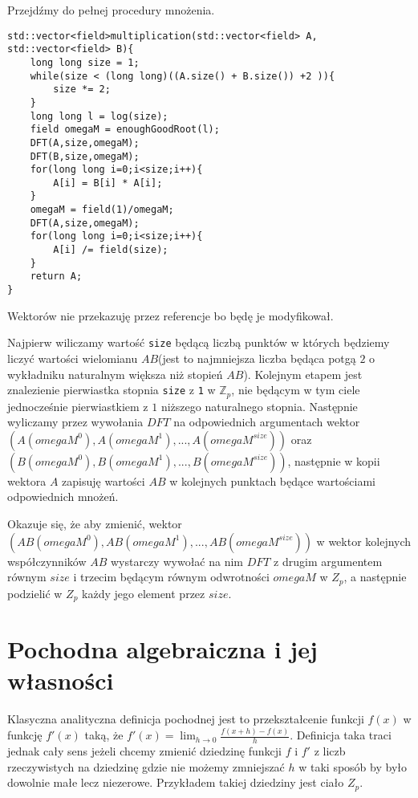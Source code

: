 \documentclass{article}
\begin{document}
Przejdźmy do pełnej procedury mnożenia. 
\begin{lstlisting}
std::vector<field>multiplication(std::vector<field> A, std::vector<field> B){
    long long size = 1;
    while(size < (long long)((A.size() + B.size()) +2 )){
        size *= 2;
    }
    long long l = log(size);
    field omegaM = enoughGoodRoot(l);
    DFT(A,size,omegaM);  
    DFT(B,size,omegaM);
    for(long long i=0;i<size;i++){
        A[i] = B[i] * A[i]; 
    }
    omegaM = field(1)/omegaM;
    DFT(A,size,omegaM);
    for(long long i=0;i<size;i++){
        A[i] /= field(size);
    } 
    return A;
}
\end{lstlisting}
Wektorów nie przekazuję przez referencje bo będę je modyfikował.

Najpierw wiliczamy wartość \texttt{size} będącą liczbą punktów w których będziemy liczyć wartości wielomianu $AB$(jest to najmniejsza liczba będąca potgą 
$2$ o wykładniku naturalnym większa niż stopień $AB$). Kolejnym etapem jest znalezienie pierwiastka stopnia \texttt{size} z \texttt{1} w $\mathbb{Z}_p$, nie będącym w tym ciele jednocześnie pierwiastkiem 
z $1$ niższego naturalnego stopnia. Następnie wyliczamy przez wywołania $DFT$ na odpowiednich argumentach wektor $(A(omegaM^0),A(omegaM^1),...,A(omegaM^{size}))$ oraz
$(B(omegaM^0),B(omegaM^1),...,B(omegaM^{size}))$, następnie w kopii wektora $A$ zapisuję wartości $AB$ w kolejnych punktach będące wartościami odpowiednich 
mnożeń.

Okazuje się, że aby zmienić, wektor $(AB(omegaM^0),AB(omegaM^1),...,AB(omegaM^{size}))$ w wektor kolejnych współczynników $AB$ wystarczy wywołać na nim $DFT$ z drugim argumentem równym $size$ i trzecim 
będącym równym odwrotności $omegaM$ w $Z_p$, a następnie podzielić w $Z_p$ każdy jego element przez $size$. 























\section{Pochodna algebraiczna i jej własności}
Klasyczna analityczna definicja pochodnej jest to przekształcenie funkcji $f(x)$ w funkcję $f'(x)$ taką, że
$f'(x)=\lim_{h \to 0}\frac{f(x+h)-f(x)}{h}$. Definicja taka traci jednak cały sens jeżeli chcemy zmienić dziedzinę
funkcji $f$ i $f'$ z liczb rzeczywistych na dziedzinę gdzie nie możemy zmniejszać $h$ w taki sposób by było 
dowolnie małe lecz niezerowe. Przykładem takiej dziedziny jest ciało $Z_p$. 
\end{document}
